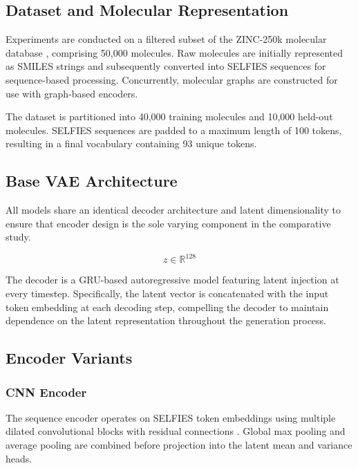 \documentclass[conference]{IEEEtran}
\begin{document}
\subsection{Dataset and Molecular Representation}

Experiments are conducted on a filtered subset of the ZINC-250k molecular database \cite{zinc_database_citation}, comprising 50,000 molecules. Raw molecules are initially represented as SMILES strings and subsequently converted into SELFIES sequences for sequence-based processing. Concurrently, molecular graphs are constructed for use with graph-based encoders.

The dataset is partitioned into 40,000 training molecules and 10,000 held-out molecules. SELFIES sequences are padded to a maximum length of 100 tokens, resulting in a final vocabulary containing 93 unique tokens.

\subsection{Base VAE Architecture}

All models share an identical decoder architecture and latent dimensionality to ensure that encoder design is the sole varying component in the comparative study.

\begin{equation}
z \in \mathbb{R}^{128}
\end{equation}

The decoder is a GRU-based autoregressive model \cite{gru_citation} featuring latent injection at every timestep. Specifically, the latent vector is concatenated with the input token embedding at each decoding step, compelling the decoder to maintain dependence on the latent representation throughout the generation process.

\subsection{Encoder Variants}

\subsubsection{CNN Encoder}

The sequence encoder operates on SELFIES token embeddings using multiple dilated convolutional blocks with residual connections \cite{dilated_cnn_citation}. Global max pooling and average pooling are combined before projection into the latent mean and variance heads.
\end{document}
